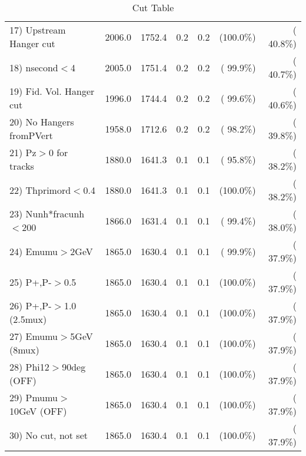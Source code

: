 \begin{table}[h!]
\begin{tabular}{||l||r|r|r|r|r|r||}
 17) Upstream Hanger cut  &       2006.0 &       1752.4 &          0.2 &          0.2 & (100.0\%) & ( 40.8\%) \\
 18) nsecond$<$4          &       2005.0 &       1751.4 &          0.2 &          0.2 & ( 99.9\%) & ( 40.7\%) \\
 19) Fid. Vol. Hanger cut &       1996.0 &       1744.4 &          0.2 &          0.2 & ( 99.6\%) & ( 40.6\%) \\
 20) No Hangers fromPVert &       1958.0 &       1712.6 &          0.2 &          0.2 & ( 98.2\%) & ( 39.8\%) \\
 21) Pz$>$0 for tracks    &       1880.0 &       1641.3 &          0.1 &          0.1 & ( 95.8\%) & ( 38.2\%) \\
 22) Thprimord$<$0.4      &       1880.0 &       1641.3 &          0.1 &          0.1 & (100.0\%) & ( 38.2\%) \\
 23) Nunh*fracunh$<$200   &       1866.0 &       1631.4 &          0.1 &          0.1 & ( 99.4\%) & ( 38.0\%) \\
 24) Emumu$>$2GeV         &       1865.0 &       1630.4 &          0.1 &          0.1 & ( 99.9\%) & ( 37.9\%) \\
 25) P+,P-$>$0.5          &       1865.0 &       1630.4 &          0.1 &          0.1 & (100.0\%) & ( 37.9\%) \\
 26) P+,P-$>$1.0 (2.5mux) &       1865.0 &       1630.4 &          0.1 &          0.1 & (100.0\%) & ( 37.9\%) \\
 27) Emumu$>$5GeV  (8mux) &       1865.0 &       1630.4 &          0.1 &          0.1 & (100.0\%) & ( 37.9\%) \\
 28) Phi12$>$90deg  (OFF) &       1865.0 &       1630.4 &          0.1 &          0.1 & (100.0\%) & ( 37.9\%) \\
 29) Pmumu$>$10GeV  (OFF) &       1865.0 &       1630.4 &          0.1 &          0.1 & (100.0\%) & ( 37.9\%) \\
 30) No cut, not set      &       1865.0 &       1630.4 &          0.1 &          0.1 & (100.0\%) & ( 37.9\%) \\
 \hline
 \hline
 \end{tabular}
 \caption{Cut Table           }
 \label{tab-cutcohjpsi-mumu_jpsi}
 \end{table}
